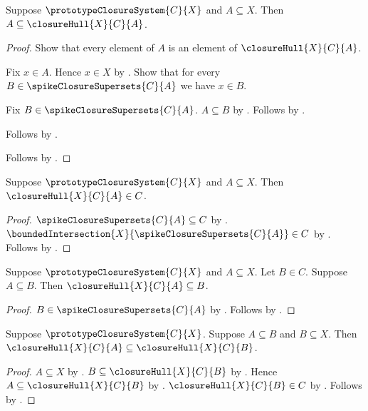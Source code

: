 \begin{proposition}\label{spike_closure_hull_extensive}
    Suppose $\prototypeClosureSystem{C}{X}$ and $A\subseteq X$.
    Then $A\subseteq\closureHull{X}{C}{A}$.
\end{proposition}
\begin{proof}
    Show that every element of $A$ is an element of
        $\closureHull{X}{C}{A}$.
    \begin{subproof}
        Fix $x\in A$.
        Hence $x\in X$ by .
        Show that for every $B\in\spikeClosureSupersets{C}{A}$ we have
            $x\in B$.
        \begin{subproof}
            Fix $B\in\spikeClosureSupersets{C}{A}$.
            $A\subseteq B$ by .
            Follows by .
        \end{subproof}
        Follows by
            .
    \end{subproof}
    Follows by .
\end{proof}

\begin{proposition}\label{spike_closure_hull_closed}
    Suppose $\prototypeClosureSystem{C}{X}$ and $A\subseteq X$.
    Then $\closureHull{X}{C}{A}\in C$.
\end{proposition}
\begin{proof}
    $\spikeClosureSupersets{C}{A}\subseteq C$ by
        .
    $\boundedIntersection{X}{\spikeClosureSupersets{C}{A}}\in C$ by
        .
    Follows by .
\end{proof}

\begin{proposition}\label{spike_closure_hull_least}
    Suppose $\prototypeClosureSystem{C}{X}$ and $A\subseteq X$.
    Let $B\in C$.
    Suppose $A\subseteq B$.
    Then $\closureHull{X}{C}{A}\subseteq B$.
\end{proposition}
\begin{proof}
    $B\in\spikeClosureSupersets{C}{A}$ by
        .
    Follows by
        .
\end{proof}

\begin{proposition}\label{spike_closure_hull_monotone}
    Suppose $\prototypeClosureSystem{C}{X}$.
    Suppose $A\subseteq B$ and $B\subseteq X$.
    Then $\closureHull{X}{C}{A}\subseteq\closureHull{X}{C}{B}$.
\end{proposition}
\begin{proof}
    $A\subseteq X$ by .
    $B\subseteq\closureHull{X}{C}{B}$ by
        .
    Hence $A\subseteq\closureHull{X}{C}{B}$ by
        .
    $\closureHull{X}{C}{B}\in C$ by
        .
    Follows by .
\end{proof}

